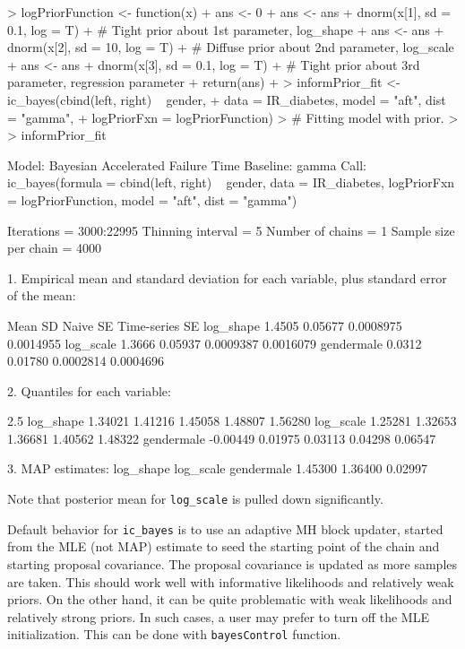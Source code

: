 \documentclass[a4paper]{article}
\begin{document}
\begin{Schunk}
\begin{Sinput}
>  logPriorFunction <- function(x){
+    ans <- 0 
+    ans <- ans + dnorm(x[1], sd = 0.1, log = T)
+    # Tight prior about 1st parameter, log_shape
+    ans <- ans + dnorm(x[2], sd = 10, log = T)
+    # Diffuse prior about 2nd parameter, log_scale
+    ans <- ans + dnorm(x[3], sd = 0.1, log = T)
+    # Tight prior about 3rd parameter, regression parameter
+    return(ans)
+  }    
> informPrior_fit <- ic_bayes(cbind(left, right) ~ gender,
+     data = IR_diabetes, model = "aft", dist = "gamma",
+     logPriorFxn = logPriorFunction)
> # Fitting model with prior. 
> 
> informPrior_fit
\end{Sinput}
\begin{Soutput}
Model:  Bayesian Accelerated Failure Time
Baseline:  gamma 
Call: ic_bayes(formula = cbind(left, right) ~ gender, data = IR_diabetes, 
    logPriorFxn = logPriorFunction, model = "aft", dist = "gamma")


Iterations = 3000:22995
Thinning interval = 5 
Number of chains = 1 
Sample size per chain = 4000 

1. Empirical mean and standard deviation for each variable,
   plus standard error of the mean:

             Mean      SD  Naive SE Time-series SE
log_shape  1.4505 0.05677 0.0008975      0.0014955
log_scale  1.3666 0.05937 0.0009387      0.0016079
gendermale 0.0312 0.01780 0.0002814      0.0004696

2. Quantiles for each variable:

               2.5%
log_shape   1.34021 1.41216 1.45058 1.48807 1.56280
log_scale   1.25281 1.32653 1.36681 1.40562 1.48322
gendermale -0.00449 0.01975 0.03113 0.04298 0.06547

3. MAP estimates:
 log_shape  log_scale gendermale 
   1.45300    1.36400    0.02997 
\end{Soutput}
\end{Schunk}

Note that posterior mean for \texttt{log\_scale} is pulled down significantly. 

Default behavior for \texttt{ic\_bayes} is to use an adaptive MH block updater, started from the MLE (not MAP) estimate to seed the starting point of the chain and starting proposal covariance. The proposal covariance is updated as more samples are taken. This should work well with informative likelihoods and relatively weak priors. On the other hand, it can be quite problematic with weak likelihoods and relatively strong priors. In such cases, a user may prefer to turn off the MLE initialization. This can be done with \texttt{bayesControl} function. 
\end{document}
